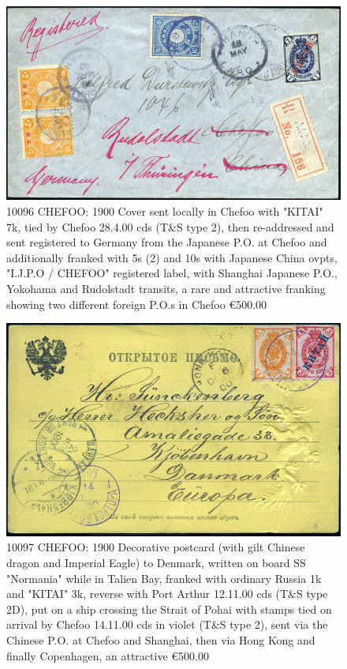 \begin{figure}[htbp]
\centering
\includegraphics[width=.95\textwidth]{../russian-post-offices-in-china/10096.jpg}
\caption{
10096	CHEFOO: 1900 Cover sent locally in Chefoo with "KITAI" 7k, tied by 
Chefoo 28.4.00 cds (T\&S type 2), then re-addressed and sent registered to 
Germany from the Japanese P.O. at Chefoo and additionally franked with 5s (2) 
and 10s with Japanese China ovpts, "I.J.P.O / CHEFOO" registered label, 
with Shanghai Japanese P.O., Yokohama and Rudolstadt transits, a rare 
and attractive franking showing two different foreign P.O.s in Chefoo
\euro 500.00 
}  
\end{figure} 

\begin{figure}[htbp]
\centering
\includegraphics[width=.95\textwidth]{../russian-post-offices-in-china/10097.jpg}
\caption{
10097	CHEFOO: 1900 Decorative postcard (with gilt Chinese dragon and Imperial Eagle)
to Denmark, written on board SS "Normania" while in Talien Bay, franked 
with ordinary Russia 1k and "KITAI" 3k, reverse with Port Arthur 12.11.00 
cds (T\&S type 2D), put on a ship crossing the Strait of Pohai with stamps
tied on arrival by Chefoo 14.11.00 cds in violet (T\&S type 2), sent via the
Chinese P.O. at Chefoo and Shanghai, then via Hong Kong and finally Copenhagen, 
an attractive
\euro 500.00 
}  
\end{figure} 

